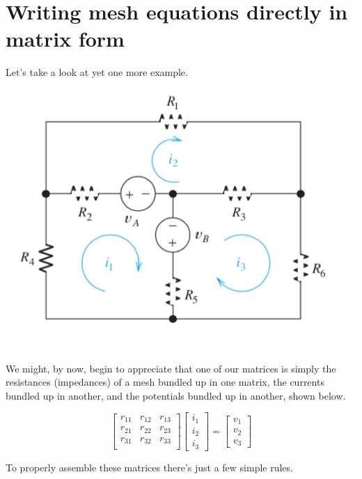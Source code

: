 \documentclass[11pt]{book}
\begin{document}
\section{Writing mesh equations directly in matrix form}
Let's take a look at yet one more example.
\begin{center}
	\includegraphics{figures/05.mesh6.png}
\end{center}

We might, by now, begin to appreciate that one of our matrices is simply the resistances (impedances) of a mesh bundled up in one matrix, the currents bundled up in another, and the potentials bundled up in another, shown below.

\begin{equation}
	\begin{bmatrix}
		r_{11} & r_{12} & r_{13} \\
		r_{21} & r_{22} & r_{23} \\
		r_{31} & r_{32} & r_{33} \\
	\end{bmatrix}
	\begin{bmatrix}
		i_1 \\ i_2 \\ i_3
	\end{bmatrix}
	=
	\begin{bmatrix}
		v_1 \\ v_2 \\ v_3
	\end{bmatrix}
\end{equation}

To properly assemble these matrices there's just a few simple rules.
\end{document}
